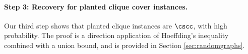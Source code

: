  

\paragraph{Step 3: Recovery for planted clique cover instances.}  Our third  step shows that planted clique instances are $\cscc$, with high probability.  The proof is a direction application of Hoeffding's inequality combined with a union bound, and is provided in Section \ref{sec:randomgraphs}.




